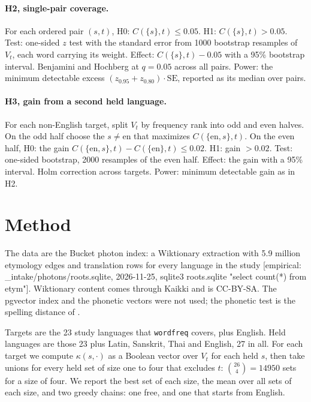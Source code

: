 \documentclass[11pt]{article}
\newcommand{\emp}[1]{{\small[empirical: #1]}}
\begin{document}
\paragraph{H2, single-pair coverage.}
For each ordered pair $(s,t)$, H0: $C(\{s\},t)\le 0.05$. H1:
$C(\{s\},t)>0.05$. Test: one-sided $z$ test with the standard error from
1000 bootstrap resamples of $V_t$, each word carrying its weight.
Effect: $C(\{s\},t)-0.05$ with a 95\% bootstrap interval. Benjamini and
Hochberg at $q=0.05$ across all pairs. Power: the minimum detectable
excess $(z_{0.95}+z_{0.80})\cdot\mathrm{SE}$, reported as its median over
pairs.

\paragraph{H3, gain from a second held language.}
For each non-English target, split $V_t$ by frequency rank into odd and
even halves. On the odd half choose the $s\ne\mathrm{en}$ that maximizes
$C(\{\mathrm{en},s\},t)$. On the even half, H0: the gain
$C(\{\mathrm{en},s\},t)-C(\{\mathrm{en}\},t)\le 0.02$. H1: gain $>0.02$.
Test: one-sided bootstrap, 2000 resamples of the even half. Effect: the
gain with a 95\% interval. Holm correction across targets. Power: minimum
detectable gain as in H2.

\section{Method}
\label{sec:method}

The data are the Bucket photon index: a Wiktionary extraction with
5.9 million etymology edges and translation rows for every language in
the study \emp{\_intake/photons/roots.sqlite, 2026-11-25, sqlite3 roots.sqlite "select count(*) from etym"}.
Wiktionary content comes through Kaikki and is CC-BY-SA. The pgvector
index and the phonetic vectors were not used; the phonetic test is the
spelling distance of .

Targets are the 23 study languages that \texttt{wordfreq} covers, plus
English. Held languages are those 23 plus Latin, Sanskrit, Thai and
English, 27 in all. For each target we compute $\kappa(s,\cdot)$ as a
Boolean vector over $V_t$ for each held $s$, then take unions for every
held set of size one to four that excludes $t$: $\binom{26}{4}=14950$ sets for a size of
four. We report the best set of each size, the mean over all sets of
each size, and two greedy chains: one free, and one that starts from
English.
\end{document}
